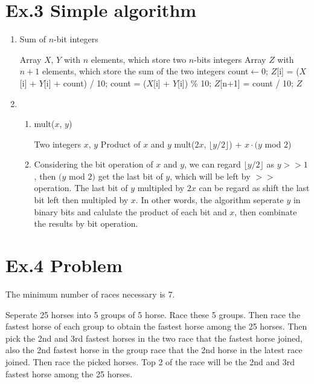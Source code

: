 \documentclass[a4paper]{article}
\begin{document}
\section*{Ex.3 Simple algorithm}
	\begin{enumerate}
		\item \begin{algorithm}
			\caption{Sum of $n$-bit integers}
			\begin{algorithmic}[1]
				\Require Array $X$, $Y$ with $n$ elements, which store two $n$-bits integers
				\Ensure Array $Z$ with $n+1$ elements, which store the sum of the two integers
				\State count$\leftarrow$0;
					\State $Z$[i] = ($X$[i] + $Y$[i] + count) / 10;
					\State count = ($X$[i] + $Y$[i]) \% 10;
				\EndFor
				\State $Z$[n+1] = count / 10;
				\State\Return $Z$
			\end{algorithmic}
		\end{algorithm}
		\item \begin{enumerate}
			\item
			\begin{algorithm}
				\caption{mult($x$, $y$)}
				\begin{algorithmic}[1]
					\Require Two integers $x$, $y$
					\Ensure Product of $x$ and $y$
					\If{$x$ = 0 \textbf{or} $y$ = 0}
						\State \Return 0
					\EndIf
					\State \Return mult($2x$, $\lfloor y/2\rfloor$) + $x\cdot(y$ mod $2$)
				\end{algorithmic}
			\end{algorithm}
			\newpage
			\item Considering the bit operation of $x$ and  $y$, we can regard $\lfloor y/2\rfloor$ as $y>>1$, then $(y$ mod $2)$ get the last bit of $y$, which will be left by $>>$ operation. The last bit of $y$ multipled by $2x$ can be regard as shift the last bit left then multipled by $x$. In other words, the algorithm seperate $y$ in binary bits and calulate the product of each bit and $x$, then combinate the results by bit operation.
			\end{enumerate}
		\end{enumerate}

\section*{Ex.4 Problem}
	The minimum number of races necessary is 7.\par
	Seperate 25 horses into 5 groups of 5 horse. Race these 5 groups. Then race the fastest horse of each group to obtain the fastest horse among the 25 horses. Then pick the 2nd and 3rd fastest horses in the two race that the fastest horse joined, also the 2nd fastest horse in the group race that the 2nd horse in the latest race joined. Then race the picked horses. Top 2 of the race will be the 2nd and 3rd fastest horse among the 25 horses.
\end{document}
